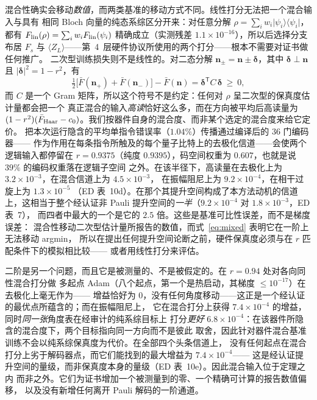 \documentclass[11pt,a4paper]{article}
\newcommand{\ket}[1]{\lvert #1\rangle}
\newcommand{\bra}[1]{\langle #1\rvert}
\begin{document}
混合性确实会移动\emph{数值}，而两类基准的移动方式不同。线性打分无法把一个混合输入与具有
相同 Bloch 向量的纯态系综区分开来：对任意分解
$\rho=\sum_iw_i\ket{\psi_i}\!\bra{\psi_i}$，
都有 $F_{\rm lin}(\rho)=\sum_iw_iF_{\rm lin}(\psi_i)$ 精确成立（实测残差
$1.1\times10^{-16}$），所以后选择分支布居 $F_s$ 与
$\langle Z_L\rangle$——第~4~层硬件协议所使用的两个打分——根本不需要对证书做任何推广。
二次型训练损失则不是线性的。对二态分解
$\mathbf n_\pm=\mathbf n\pm\boldsymbol\delta$，其中 $\boldsymbol\delta\perp\mathbf
n$ 且 $|\boldsymbol\delta|^2=1-r^2$，有
\begin{equation}
\tfrac12\big[\bar F(\mathbf n_+)+\bar F(\mathbf n_-)\big]-\bar F(\mathbf n)
=\boldsymbol\delta^{\mathsf T}C\,\boldsymbol\delta\ \ge\ 0 ,
\label{eq:overread}
\end{equation}
而 $C$ 是一个 Gram 矩阵，所以这个符号不是约定：任何对 $\rho$ 呈二次型的保真度估计量都会把一个
真正混合的输入\emph{高读}恰好这么多，而在方向被平均后高读量为
$(1-r^2)(\bar F_{\rm Haar}-c_0)$。我们按器件自身的混合度、而非某个选定的混合度来给它定价。
把本次运行隐含的平均单指令错误率（$1.04\%$）传播通过编译后的 $36$ 门编码器——
作为作用在每条指令所触及的每个量子比特上的去极化信道——会使两个逻辑输入都停留在
$r=0.9375$（纯度 $0.9395$），码空间权重为 $0.607$，也就是说 $39\%$ 的编码权重落在逻辑子空间
之外。在该半径下，高读量在去极化上为 $3.2\times10^{-3}$，在混合信道上为 $4.5\times10^{-3}$，
在振幅阻尼上为 $9.2\times10^{-4}$，在相干过旋上为 $1.3\times10^{-5}$
（ED 表~10d）。在那个其提升空间构成了本方法动机的信道上，这相当于整个经认证非 Pauli
提升空间的\emph{一半}（$9.2\times10^{-4}$ 对 $1.8\times10^{-3}$，ED 表~7），
而四者中最大的一个是它的 $2.5$ 倍。这些是基准可比性误差，而不是梯度误差：
混合性移动二次型估计量所报告的数值，而式~\eqref{eq:mixed} 表明它在一阶上无法移动 argmin，
所以在提出任何提升空间论断之前，硬件保真度必须与在 $r$ 匹配条件下的模拟相比较——
或者用线性打分来评估。

二阶是另一个问题，而且它是被测量的、不是被假定的。在 $r=0.94$ 处对各向同性混合打分做
多起点 Adam（八个起点，第一个是热启动，其梯度 $\le10^{-17}$）在去极化上毫无作为——
增益恰好为 $0$，没有任何角度移动——这正是一个经认证的最优点所蕴含的；而在振幅阻尼上，
它在混合打分上获得 $7.4\times10^{-4}$ 的增益，同时\emph{同一张}角度表在经审计的纯系综目标上
打分\emph{更好} $6.8\times10^{-4}$：在该器件所隐含的混合度下，两个目标指向同一方向而不是彼此
取舍，因此针对器件混合基准训练不会以纯系综保真度为代价。在全部四个头条信道上，
没有任何起点在混合打分上劣于解码器点，而它们能找到的最大增益为 $7.4\times10^{-4}$——
这是经认证提升空间的量级，而非保真度本身的量级（ED 表~10e）。因此混合输入位于定理之内
而非之外。它们为证书增加一个被测量到的零、一个精确可计算的报告数值偏移，
以及没有新增任何离开 Pauli 解码的一阶通道。
\end{document}
